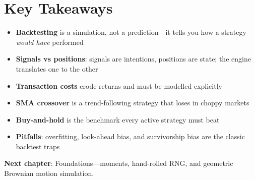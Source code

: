 \section{Key Takeaways}

\begin{itemize}
    \item \textbf{Backtesting} is a simulation, not a prediction---it tells you
      how a strategy \emph{would have} performed
    \item \textbf{Signals vs positions}: signals are intentions, positions are
      state; the engine translates one to the other
    \item \textbf{Transaction costs} erode returns and must be modelled
      explicitly
    \item \textbf{SMA crossover} is a trend-following strategy that loses in
      choppy markets
    \item \textbf{Buy-and-hold} is the benchmark every active strategy must beat
    \item \textbf{Pitfalls}: overfitting, look-ahead bias, and survivorship bias
      are the classic backtest traps
\end{itemize}

\vspace{1em}
\noindent\textbf{Next chapter}: Foundations---moments, hand-rolled RNG, and
geometric Brownian motion simulation.